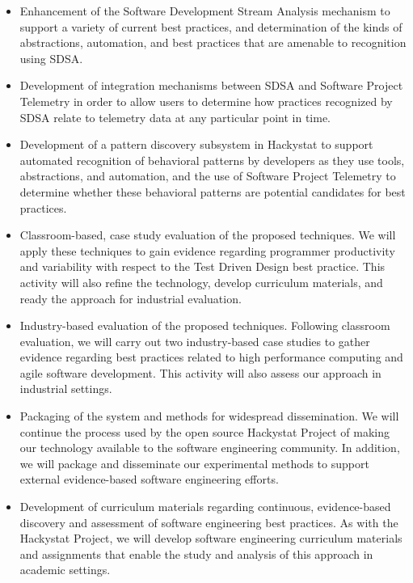 \begin{itemize}
  
\item Enhancement of the Software Development Stream Analysis mechanism to
  support a variety of current best practices, and determination of the
  kinds of abstractions, automation, and best practices that are amenable
  to recognition using SDSA.

\item Development of integration mechanisms between SDSA and Software
  Project Telemetry in order to allow users to determine how practices
  recognized by SDSA relate to telemetry data at any particular point in time.
  
\item Development of a pattern discovery subsystem in Hackystat to support
automated recognition of behavioral patterns by developers as they use tools, 
abstractions, and automation, and the use of Software Project Telemetry to 
determine whether these behavioral patterns are potential candidates for best
practices. 
  
\item Classroom-based, case study evaluation of the proposed techniques. We will 
apply these techniques to gain evidence regarding programmer productivity and variability 
with respect to the Test Driven Design best practice. This activity will also 
refine the technology, develop curriculum materials, and ready the approach for 
industrial evaluation. 

\item Industry-based evaluation of the proposed techniques. Following
classroom evaluation, we will carry out two industry-based case studies
to gather evidence regarding best practices related to high performance computing 
and agile software development. This activity will also assess our approach
in industrial settings. 
  
\item Packaging of the system and methods for widespread dissemination.  We
will continue the process used by the open source Hackystat Project of making
our technology available to the software engineering community.  In addition, 
we will package and disseminate our experimental methods to support external
evidence-based software engineering efforts. 
  
\item Development of curriculum materials regarding continuous,
  evidence-based discovery and assessment of software engineering best
  practices. As with the Hackystat Project, we will develop software engineering
  curriculum materials and assignments that enable the study and analysis
  of this approach in academic settings.

\end{itemize}


